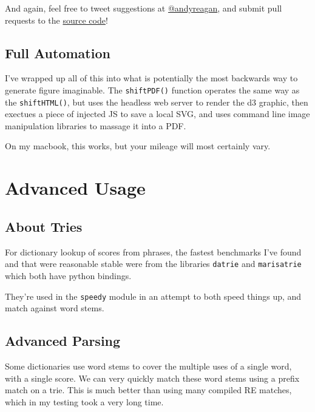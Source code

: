 And again, feel free to tweet suggestions at \href{https://twitter.com/andyreagan}{@andyreagan}, and submit pull requests to the \href{https://github.com/andyreagan/labMT-simple}{source code}!

\subsection{Full Automation}
\label{wordshifts:full-automation}
I've wrapped up all of this into what is potentially the most backwards way to generate figure imaginable.
The \lstinline{shiftPDF()} function operates the same way as the \lstinline{shiftHTML()}, but uses the headless web server to render the d3 graphic, then exectues a piece of injected JS to save a local SVG, and uses command line image manipulation libraries to massage it into a PDF.

On my macbook, this works, but your mileage will most certainly vary.


\section{Advanced Usage}
\label{advanced::doc}\label{advanced:advanced-usage}

\subsection{About Tries}
\label{advanced:about-tries}
For dictionary lookup of scores from phrases, the fastest benchmarks I've found and that were reasonable stable were from the libraries \lstinline{datrie} and \lstinline{marisatrie} which both have python bindings.

They're used in the \lstinline{speedy} module in an attempt to both speed things up, and match against word stems.

\subsection{Advanced Parsing}
\label{advanced:advanced-parsing}
Some dictionaries use word stems to cover the multiple uses of a single word, with a single score.
We can very quickly match these word stems using a prefix match on a trie.
This is much better than using many compiled RE matches, which in my testing took a very long time.


